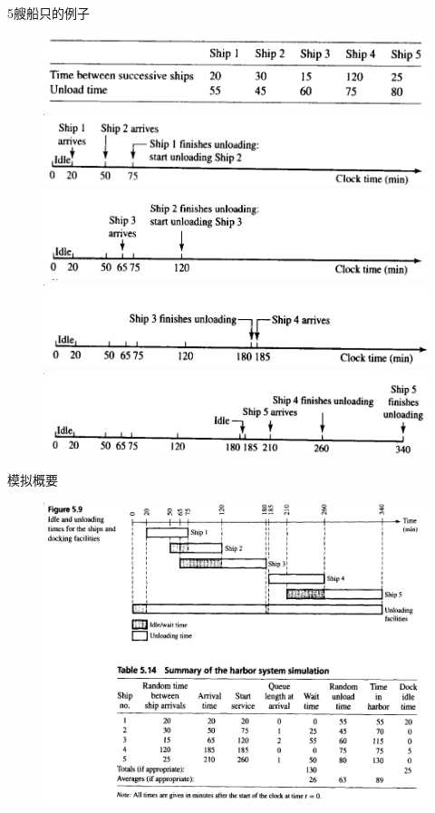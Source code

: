\documentclass[mathserif, table]{beamer}
\begin{document}
\begin{frame}{5艘船只的例子}
  \begin{figure}
    \includegraphics[width=.7\textwidth{}]{ships.png}\\
    \includegraphics[width=.5\textwidth{}]{ship-t1.png}
    \includegraphics[width=.5\textwidth{}]{ship-t2.png}\\
    \includegraphics[width=.5\textwidth{}]{ship-t3.png}
    \includegraphics[width=.5\textwidth{}]{ship-t4.png}
  \end{figure}  
  
\end{frame}

\begin{frame}{模拟概要}
  \begin{figure}
    \includegraphics[height=.85\textheight{}]{ship-summary.png}
  \end{figure}  

\end{frame}
\end{document}
